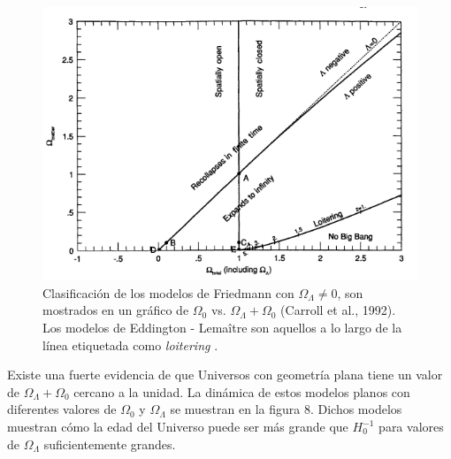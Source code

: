 \documentclass[11pt]{article}
\begin{document}
    
    \begin{figure}[H]         
     \centering
     \includegraphics[width=1.0\textwidth]{friedmann_worldspp228_Malcolm.png}
        \caption{\footnotesize{Clasificación de los modelos de Friedmann con $\Omega_{\Lambda} \neq 0$, son mostrados en un gráfico de $\Omega_0$ vs. $\Omega_{\Lambda} + \Omega_0$ (Carroll et al., 1992). Los modelos de Eddington - Lema\^itre son aquellos a lo largo de la línea etiquetada como {\textit{loitering} }.}}
     \end{figure}
    
    Existe una fuerte evidencia de que Universos con geometría plana tiene un valor de $\Omega_{\Lambda} + \Omega_0$ cercano a la unidad. La dinámica de estos modelos planos con diferentes valores de $\Omega_0$ y $\Omega_{\Lambda}$ se muestran en la figura 8. Dichos modelos muestran cómo la edad del Universo puede ser más grande que $H_0^{-1}$ para valores de $\Omega_{\Lambda}$ suficientemente grandes. 
    
\end{document}
